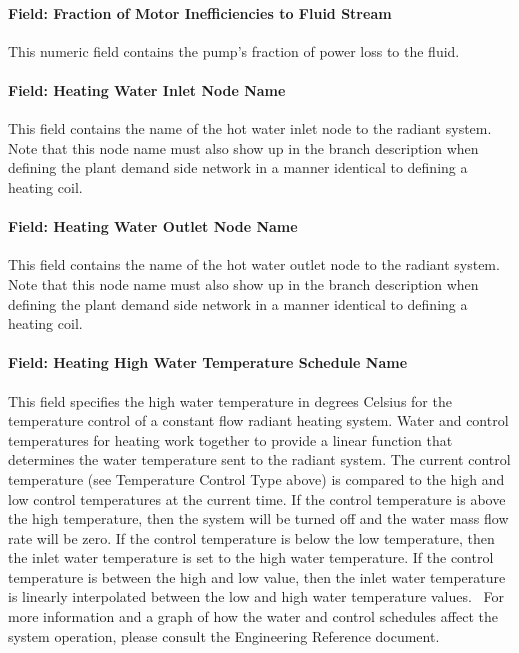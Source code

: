 \paragraph{Field: Fraction of Motor Inefficiencies to Fluid Stream}\label{field-fraction-of-motor-inefficiencies-to-fluid-stream-000}

This numeric field contains the pump's fraction of power loss to the fluid.

\paragraph{Field: Heating Water Inlet Node Name}\label{field-heating-water-inlet-node-name-1}

This field contains the name of the hot water inlet node to the radiant system. Note that this node name must also show up in the branch description when defining the plant demand side network in a manner identical to defining a heating coil.

\paragraph{Field: Heating Water Outlet Node Name}\label{field-heating-water-outlet-node-name-1}

This field contains the name of the hot water outlet node to the radiant system. Note that this node name must also show up in the branch description when defining the plant demand side network in a manner identical to defining a heating coil.

\paragraph{Field: Heating High Water Temperature Schedule Name}\label{field-heating-high-water-temperature-schedule-name}

This field specifies the high water temperature in degrees Celsius for the temperature control of a constant flow radiant heating system. Water and control temperatures for heating work together to provide a linear function that determines the water temperature sent to the radiant system. The current control temperature (see Temperature Control Type above) is compared to the high and low control temperatures at the current time. If the control temperature is above the high temperature, then the system will be turned off and the water mass flow rate will be zero. If the control temperature is below the low temperature, then the inlet water temperature is set to the high water temperature. If the control temperature is between the high and low value, then the inlet water temperature is linearly interpolated between the low and high water temperature values.~ For more information and a graph of how the water and control schedules affect the system operation, please consult the Engineering Reference document.

